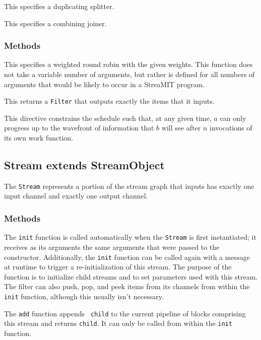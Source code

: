   This specifies a duplicating splitter.

  This specifies a combining joiner.

\subsubsection{Methods}

  This
specifies a weighted round robin with the given weights.  This
function does not take a variable number of arguments, but rather is
defined for all numbers of arguments that would be likely to occur in
a StreaMIT program.

 This returns a {\tt Filter} that outputs
exactly the items that it inputs.

  This directive
constrains the schedule such that, at any given time, $a$ can only
progress up to the wavefront of information that $b$ will see after
$n$ invocations of its own work function.

\subsection{Stream extends StreamObject}

The {\tt Stream} represents a portion of the stream graph that inputs
has exactly one input channel and exactly one output channel.

\subsubsection{Methods}

  The {\tt init} function is
called automatically when the {\tt Stream} is first instantiated; it
receives as its arguments the same arguments that were passed to the
constructor.  Additionally, the {\tt init} function can be called
again with a message at runtime to trigger a re-initialization of this
stream.  The purpose of the function is to initialize child streams
and to set parameters used with this stream.  The filter can also
push, pop, and peek items from its channels from within the {\tt init}
function, although this usually isn't necessary.

  The {\tt add} function appends {\tt
child} to the current pipeline of blocks comprising this stream and
returns {\tt child}.  It can only be called from within the {\tt init}
function.

